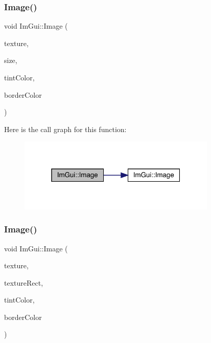 \subsubsection{\texorpdfstring{Image()}{Image()}\hspace{0.1cm}{\footnotesize\ttfamily [2/6]}}
{\footnotesize\ttfamily void Im\+Gui\+::\+Image (\begin{DoxyParamCaption}\item[{const sf\+::\+Texture \&}]{texture,  }\item[{const sf\+::\+Vector2f \&}]{size,  }\item[{const sf\+::\+Color \&}]{tint\+Color,  }\item[{const sf\+::\+Color \&}]{border\+Color }\end{DoxyParamCaption})}

Here is the call graph for this function\+:
\nopagebreak
\begin{figure}[H]
\begin{center}
\leavevmode
\includegraphics[width=268pt]{df/d13/namespace_im_gui_ad6ab801840d7c487d66946ceca63632f_cgraph}
\end{center}
\end{figure}
\mbox{\label{namespace_im_gui_a38a669345d55f897af0964def4acdc07}} 
\subsubsection{\texorpdfstring{Image()}{Image()}\hspace{0.1cm}{\footnotesize\ttfamily [3/6]}}
{\footnotesize\ttfamily void Im\+Gui\+::\+Image (\begin{DoxyParamCaption}\item[{const sf\+::\+Texture \&}]{texture,  }\item[{const sf\+::\+Float\+Rect \&}]{texture\+Rect,  }\item[{const sf\+::\+Color \&}]{tint\+Color,  }\item[{const sf\+::\+Color \&}]{border\+Color }\end{DoxyParamCaption})}

